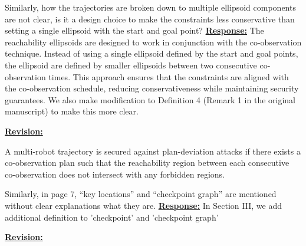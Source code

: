 \documentclass{article}
\newcommand{\re}{\tcblower \underline{\textbf{Response:}}\quad}
\newcommand{\rv}{{\large{\underline{\textbf{Revision:}}}}\quad}
\newcommand{\news}{\color{blue}}
\begin{document}
\vspace{0.3cm}

\begin{cmt}{}{}
	Similarly, how the
	trajectories are broken down to multiple ellipsoid components are not
	clear, is it a design choice to make the constraints less conservative
	than setting a single ellipsoid with the start and goal point?
	\re 
	The reachability ellipsoids are designed to work in conjunction with the co-observation technique. Instead of using a single ellipsoid defined by the start and goal points, the ellipsoid are defined by smaller ellipsoids between two consecutive co-observation times. This approach ensures that the constraints are aligned with the co-observation schedule, reducing conservativeness while maintaining security guarantees. We also make modification to Definition 4 (Remark 1 in the original manuscript) to make this more clear.
\end{cmt}
\rv
{\news \setcounter{definition}{3}
 \begin{definition}\label{rmk:revised-security}
	A multi-robot trajectory is secured against plan-deviation attacks if there exists a co-observation plan such that the reachability region between each consecutive co-observation does not intersect with any forbidden regions.
\end{definition}}

\vspace{0.3cm}
\begin{cmt}{}{}
	Similarly, in page 7, “key locations” and “checkpoint graph” are
	mentioned without clear explanations what they are.
	\re  
	In Section III, we add additional definition to 'checkpoint' and 'checkpoint graph'
\end{cmt}
\rv
\end{document}
